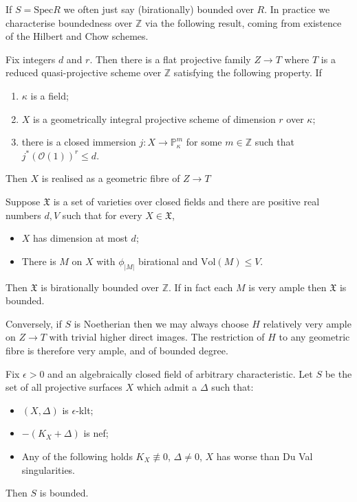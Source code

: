 \documentclass[a4paper,12pt]{book}
\newcommand{\Vol}{\text{Vol}}
\begin{document}
If $S=\text{Spec}{R}$ we often just say (birationally) bounded over $R$. In practice we characterise boundedness over $\mathbb{Z}$ via the following result, coming from existence of the Hilbert and Chow schemes.

\begin{lemma}\cite[Proposition 5.3]{tanaka2019boundedness}
	Fix integers $d$ and $r$. Then there is a flat projective family $Z \to T$ where $T$ is a reduced quasi-projective scheme over $\mathbb{Z}$ satisfying the following property. If
	\begin{enumerate}
		\item $\kappa$ is a field;
		\item $X$ is a geometrically integral projective scheme of dimension $r$ over $\kappa$;
		\item there is a closed immersion $j\colon X \to \mathbb{P}^{m}_{\kappa}$ for some $m\in \mathbb{Z}$ such that $j^{*}(\mathcal{O}(1))^{r} \leq d$.
	\end{enumerate}
	
	Then $X$ is realised as a geometric fibre of $Z \to T$
\end{lemma}

\begin{corollary}\label{l_birationally-bounded}
	Suppose $\mathfrak{X}$ is a set of varieties over closed fields and there are positive real numbers $d,V$ such that for every $X \in \mathfrak{X}$,
	\begin{itemize}
		\item $X$ has dimension at most $d$;
		\item There is $M$ on $X$ with $\phi_{|M|}$ birational and $\Vol(M)\leq V$.
	\end{itemize}
	Then $\mathfrak{X}$ is birationally bounded over $\mathbb{Z}$. If in fact each $M$ is very ample then $\mathfrak{X}$ is bounded. 
\end{corollary}

Conversely, if $S$ is Noetherian then we may always choose $H$ relatively very ample on $Z \to T$ with trivial higher direct images. The restriction of $H$ to any geometric fibre is therefore very ample, and of bounded degree. 


	\begin{theorem}\cite[Theorem 6.9]{alexeev1994boundedness}\label{BAB}
		Fix $\epsilon >0$ and an algebraically closed field of arbitrary characteristic. Let $S$ be the set of all projective surfaces $X$ which admit a $\Delta$ such that:
		\begin{itemize}
			\item $(X,\Delta)$ is $\epsilon$-klt;
			\item $-(K_{X}+\Delta)$ is nef;
			\item Any of the following holds $K_{X} \not\equiv 0$, $\Delta \neq 0$, $X$ has worse than Du Val singularities.
		\end{itemize}
		Then $S$ is bounded.
	\end{theorem}
\end{document}
